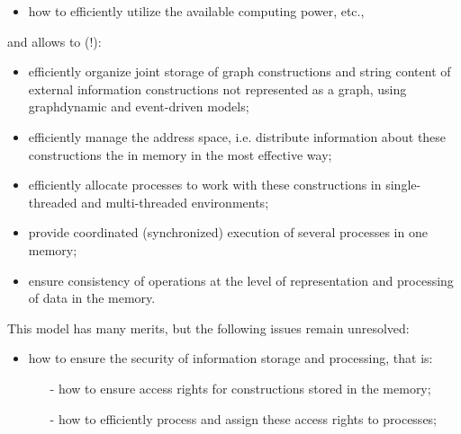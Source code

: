 \documentclass{article}
\begin{document}
\begin{multicols}{2}
\begin{itemize}
\itemsep = 0mm
\item how to efficiently utilize the available computing
power, etc.,
\end{itemize}

and allows to (!):

\begin{itemize}
\itemsep = 0mm
\item efficiently organize joint storage of graph constructions and string content of external information constructions not represented as a graph, using graphdynamic and event-driven models;
\end{itemize}

\begin{itemize}
\itemsep = 0mm
\item efficiently manage the address space, i.e. distribute
information about these constructions the in memory in the most effective way;
\end{itemize}

\begin{itemize}
\itemsep = 0mm
\item efficiently allocate processes to work with these
constructions in single-threaded and multi-threaded
environments;
\end{itemize}

\begin{itemize}
\itemsep = 0mm
\item provide coordinated (synchronized) execution of several processes in one memory;
\end{itemize}

\begin{itemize}
\itemsep = 0mm
\item ensure consistency of operations at the level of representation and processing of data in the memory.
\end{itemize}

This model has many merits, but the following issues
remain unresolved:

\begin{itemize}
\itemsep = 0mm
\item how to ensure the security of information storage
and processing, that is:

\begin{itemize}
\itemsep=0mm
\item[-]how to ensure access rights for constructions
stored in the memory;

\item[-]how to efficiently process and assign these access
rights to processes;


\end{itemize}
\end{itemize}
\end{multicols}
\end{document}
